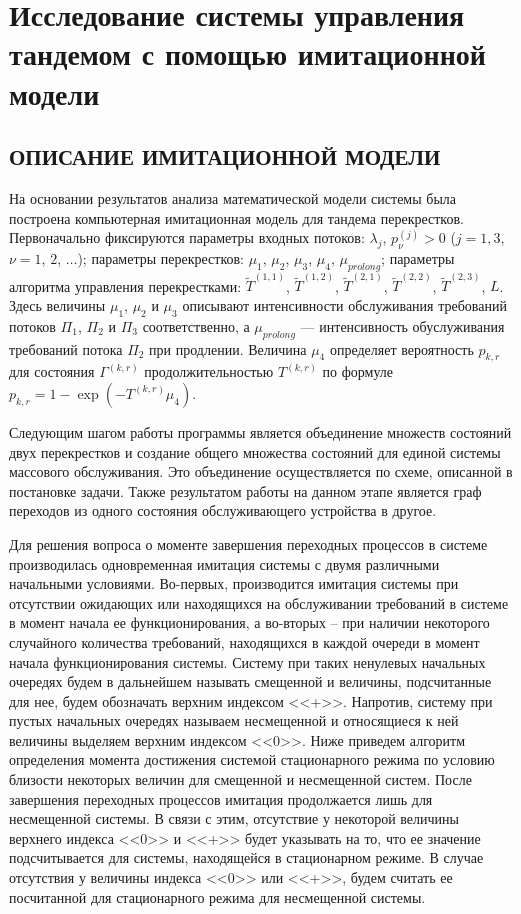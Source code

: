 \documentclass[11pt]{ubs}
\begin{document}
\section{Исследование системы управления тандемом с помощью имитационной модели}

\subsection{ОПИСАНИЕ ИМИТАЦИОННОЙ МОДЕЛИ}
На основании результатов анализа математической модели системы была построена компьютерная имитационная модель для тандема перекрестков. Первоначально фиксируются параметры входных потоков:
$\lambda_j$,  $p_{\nu}^{(j)}>0$ ($j=1,3$, $\nu=1$, $2$, $\ldots$); параметры перекрестков: $\mu_1$, $\mu_2$,  $\mu_3$, $\mu_4$, $\mu_{prolong}$; параметры алгоритма управления перекрестками: $\widetilde T^{(1,1)}$, $\widetilde T^{(1,2)}$, $\widetilde T^{(2,1)}$, $\widetilde T^{(2,2)}$, $\widetilde T^{(2,3)}$, $L$. Здесь величины $\mu_1$, $\mu_2$ и $\mu_3$  описывают интенсивности обслуживания требований потоков $\Pi_1$, $\Pi_2$ и $\Pi_3$ соответственно, а $\mu_{prolong}$ --- интенсивность обуслуживания требований потока $\Pi_2$ при продлении. Величина $\mu_4$ определяет вероятность $p_{k,r}$ для состояния $\Gamma^{(k,r)}$ продолжительностью $T^{(k,r)}$ по формуле $p_{k,r} = 1- \exp{(- T^{(k,r)} \mu_4)}$.  

Следующим шагом работы программы является объединение множеств состояний двух перекрестков и создание общего множества состояний для единой системы массового обслуживания. Это объединение осуществляется по схеме, описанной в постановке задачи. Также результатом работы на данном этапе является граф переходов из одного состояния обслуживающего устройства в другое.

Для решения вопроса о моменте завершения переходных процессов в системе производилась одновременная имитация системы с двумя различными начальными условиями. Во-первых, производится имитация системы при отсутствии ожидающих или находящихся на обслуживании требований в системе в момент начала ее функционирования, а во-вторых -- при наличии некоторого случайного количества требований, находящихся в каждой очереди  в момент начала функционирования системы. Систему при таких ненулевых начальных очередях будем в дальнейшем называть смещенной и величины, подсчитанные для нее, будем обозначать верхним индексом <<+>>. Напротив, систему при пустых начальных очередях называем несмещенной и относящиеся к ней величины выделяем верхним индексом <<0>>. Ниже приведем алгоритм определения момента достижения системой стационарного режима по условию близости некоторых величин для смещенной и несмещенной систем. После завершения переходных процессов имитация продолжается лишь для несмещенной системы. В связи с этим, отсутствие у некоторой величины верхнего индекса <<0>> и <<+>> будет указывать на то, что ее значение подсчитывается для системы, находящейся в стационарном режиме. В случае отсутствия у величины индекса <<0>> или <<+>>, будем считать ее посчитанной для стационарного режима для несмещенной системы.
\end{document}
